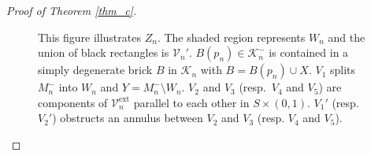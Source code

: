 \documentclass{amsart}
\theoremstyle{definition}
\numberwithin{figure}{section}
\numberwithin{equation}{section}
\def\ck{\mathcal{K}}
\def\cv{\mathcal{V}}
\begin{document}
\begin{proof}[Proof of Theorem \ref{thm_c}]
\begin{figure}[hbtp]
\caption{This figure illustrates $Z_n$.
The shaded region represents $W_n$ and the union of black rectangles is $\cv_n'$.
$B(p_n)\in \ck_n^-$ is contained in a simply degenerate brick $B$ in $\ck_n$ with $B= B(p_n)\cup X$. 
$V_1$ splits $M_n^-$ into $W_n$ and $Y= M_n^-\setminus W_n$.
$V_2$ and $V_3$ (resp.\ $V_4$ and $V_5$) are components of $\cv_n^{\mathrm{ext}}$ parallel to each other in 
$S\times (0,1)$.
$V_1'$ (resp.\ $V_2'$) obstructs an annulus between $V_2$ and $V_3$ (resp. $V_4$ and $V_5$).
}
\label{fig4_2}
\end{figure}

\end{proof}
\end{document}
